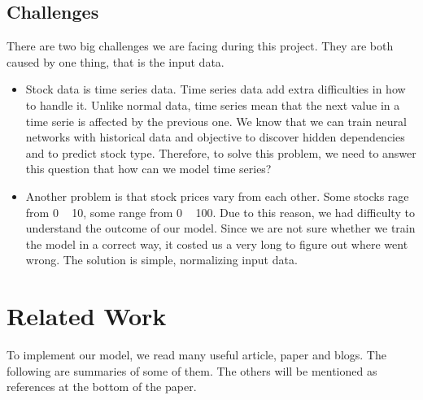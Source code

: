 \documentclass[12pt]{article}
\begin{document}
\subsection{Challenges}
There are two big challenges we are facing during this project. They are both caused by one thing,
that is the input data. 

\begin{itemize}
\item Stock data is time series data. Time series data add extra 
difficulties in how to handle it. Unlike normal data, time series mean that the next 
value in a time serie is affected by the previous one. We know that we can train 
neural networks with historical data and objective to discover hidden dependencies and 
to predict stock type. Therefore, to solve this problem, we need to answer this question 
that how can we model time series?
\item Another problem is that stock prices vary from each other. Some stocks rage from 
0 ~ 10, some range from 0 ~ 100. Due to this reason, we had difficulty to understand the outcome 
of our model. Since we are not sure whether we train the model in a correct way, it costed us a very 
long to figure out where went wrong. The solution is simple, normalizing input data.
\end{itemize}


\section{Related Work}
To implement our model, we read many useful article, paper and blogs. The following are 
summaries of some of them. The others will be mentioned as references at the bottom of the paper.
\end{document}
